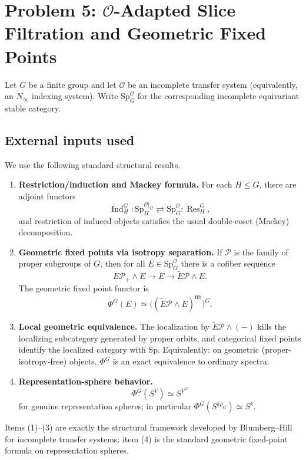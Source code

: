 \section{Problem 5: $\mathcal O$-Adapted Slice Filtration and Geometric Fixed Points}\label{sec:q5}

Let $G$ be a finite group and let $\mathcal O$ be an incomplete transfer system (equivalently, an $N_\infty$ indexing system). Write $\mathrm{Sp}^{\mathcal O}_G$ for the corresponding incomplete equivariant stable category.

\subsection*{External inputs used}

We use the following standard structural results.

\begin{enumerate}
\item \textbf{Restriction/induction and Mackey formula.}
For each $H\le G$, there are adjoint functors
\[
\operatorname{Ind}^G_H:\mathrm{Sp}^{\mathcal O|_H}_H \rightleftarrows \mathrm{Sp}^{\mathcal O}_G:\operatorname{Res}^G_H,
\]
and restriction of induced objects satisfies the usual double-coset (Mackey) decomposition.
\item \textbf{Geometric fixed points via isotropy separation.}
If $\mathcal P$ is the family of proper subgroups of $G$, then for all $E\in\mathrm{Sp}^{\mathcal O}_G$ there is a cofiber sequence
\[
E\mathcal P_+\wedge E\longrightarrow E\longrightarrow \widetilde E\mathcal P\wedge E.
\]
The geometric fixed point functor is
\[
\Phi^G(E)\simeq \bigl((\widetilde E\mathcal P\wedge E)^{\mathrm{fib}}\bigr)^G.
\]
\item \textbf{Local geometric equivalence.}
The localization by $\widetilde E\mathcal P\wedge(-)$ kills the localizing subcategory generated by proper orbits, and categorical fixed points identify the localized category with $\mathrm{Sp}$.
Equivalently: on geometric (proper-isotropy-free) objects, $\Phi^G$ is an exact equivalence to ordinary spectra.
\item \textbf{Representation-sphere behavior.}
\[
\Phi^G(S^{V})\simeq S^{V^G}
\]
for genuine representation spheres; in particular $\Phi^G(S^{k\rho_G})\simeq S^k$.
\end{enumerate}

Items (1)--(3) are exactly the structural framework developed by Blumberg--Hill for incomplete transfer systems; item (4) is the standard geometric fixed-point formula on representation spheres.


